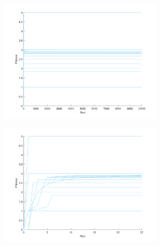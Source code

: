 \documentclass[11pt]{article}
\begin{document}
\begin{figure}[h]
\begin{minipage}{.5\textwidth}
  \includegraphics[width=3.25in]{default.png}
  \label{fig:default}
\end{minipage}%
\begin{minipage}{.5\textwidth}
  \includegraphics[width=3.25in]{default_limited.png}
  \label{fig:default_limited}
\end{minipage}
\end{figure}
\end{document}
